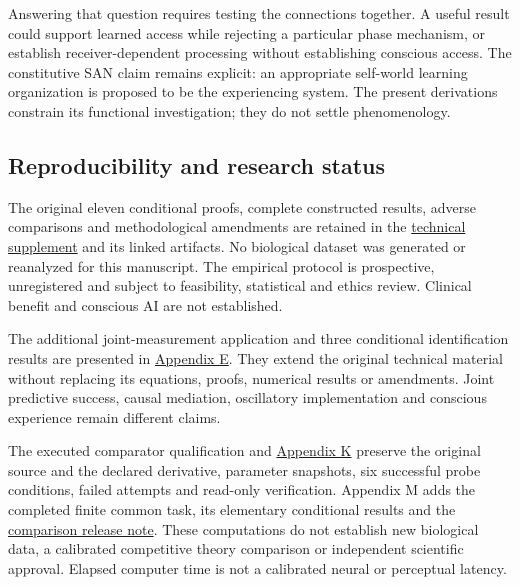 \documentclass[
  american,
  11pt,
  letterpaper,
]{article}
\begin{document}
Answering that question requires testing the connections together. A useful result could support learned access while rejecting a particular phase mechanism, or establish receiver-dependent processing without establishing conscious access. The constitutive SAN claim remains explicit: an appropriate self-world learning organization is proposed to be the experiencing system. The present derivations constrain its functional investigation; they do not settle phenomenology.

\subsection{Reproducibility and research status}\label{reproducibility-and-research-status}

The original eleven conditional proofs, complete constructed results, adverse comparisons and methodological amendments are retained in the \href{https://raw.githubusercontent.com/v5ma/v5ma.github.io/master/papers/companions/learning-to-feel-v1.0/Learning-to-Feel-Technical-Supplement-v1.0.pdf}{technical supplement} and its linked artifacts. No biological dataset was generated or reanalyzed for this manuscript. The empirical protocol is prospective, unregistered and subject to feasibility, statistical and ethics review. Clinical benefit and conscious AI are not established.

The additional joint-measurement application and three conditional identification results are presented in \href{https://raw.githubusercontent.com/v5ma/v5ma.github.io/master/papers/companions/learning-to-feel-v1.0/Learning-to-Feel-Technical-Supplement-v1.0.pdf\#appendix-e}{Appendix E}. They extend the original technical material without replacing its equations, proofs, numerical results or amendments. Joint predictive success, causal mediation, oscillatory implementation and conscious experience remain different claims.

The executed comparator qualification and \href{https://raw.githubusercontent.com/v5ma/v5ma.github.io/master/papers/companions/learning-to-feel-v1.0/Learning-to-Feel-Technical-Supplement-v1.0.pdf\#appendix-k}{Appendix K} preserve the original source and the declared derivative, parameter snapshots, six successful probe conditions, failed attempts and read-only verification. Appendix M adds the completed finite common task, its elementary conditional results and the \href{https://github.com/v5ma/v5ma.github.io/blob/master/papers/companions/learning-to-feel-v1.0/ARTIFACT-AVAILABILITY.md#artifact-36}{comparison release note}. These computations do not establish new biological data, a calibrated competitive theory comparison or independent scientific approval. Elapsed computer time is not a calibrated neural or perceptual latency.
\end{document}
